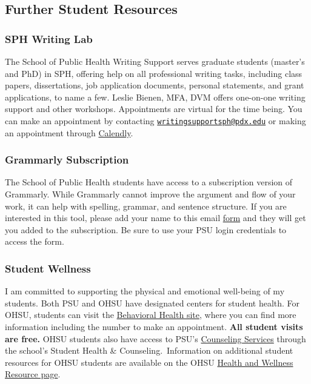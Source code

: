 \documentclass[
  letterpaper,
  DIV=11,
  numbers=noendperiod]{scrartcl}
\begin{document}
\hypertarget{further-student-resources}{%
\subsection{Further Student Resources}\label{further-student-resources}}

\hypertarget{sph-writing-lab}{%
\subsubsection{SPH Writing Lab}\label{sph-writing-lab}}

The School of Public Health Writing Support serves graduate students
(master's and PhD) in SPH, offering help on all professional writing
tasks, including class papers, dissertations, job application documents,
personal statements, and grant applications, to name a few. Leslie
Bienen, MFA, DVM offers one-on-one writing support and other workshops.
Appointments are virtual for the time being. You can make an appointment
by contacting
\href{mailto:writingsupportsph@pdx.edu}{\nolinkurl{writingsupportsph@pdx.edu}}
or making an appointment through
\href{https://calendly.com/writingsupportsph/writing-meeting}{Calendly}.

\hypertarget{grammarly-subscription}{%
\subsubsection{Grammarly Subscription}\label{grammarly-subscription}}

The School of Public Health students have access to a subscription
version of Grammarly. While Grammarly cannot improve the argument and
flow of your work, it can help with spelling, grammar, and sentence
structure. If you are interested in this tool, please add your name to
this email
\href{https://docs.google.com/forms/d/1IQWFsARrTJlasK2a5JTonR4ygr8MxqIzbh_bAxKmWWI/edit?ts=614ce07a}{form}
and they will get you added to the subscription. Be sure to use your PSU
login credentials to access the form.

\hypertarget{student-wellness}{%
\subsubsection{Student Wellness}\label{student-wellness}}

I am committed to supporting the physical and emotional well-being of my
students. Both PSU and OHSU have designated centers for student health.
For OHSU, students can visit the
\href{https://www.ohsu.edu/education/behavioral-health}{Behavioral
Health site}, where you can find more information including the number
to make an appointment. \textbf{All student visits are free.} OHSU
students also have access to PSU's
\href{https://www.pdx.edu/health-counseling/counseling}{Counseling
Services} through the school's Student Health \& Counseling.~Information
on additional student resources for OHSU students are available on the
OHSU \href{https://ohsu-psu-sph.org/health_and_wellness/}{Health and
Wellness Resource page}.~
\end{document}
